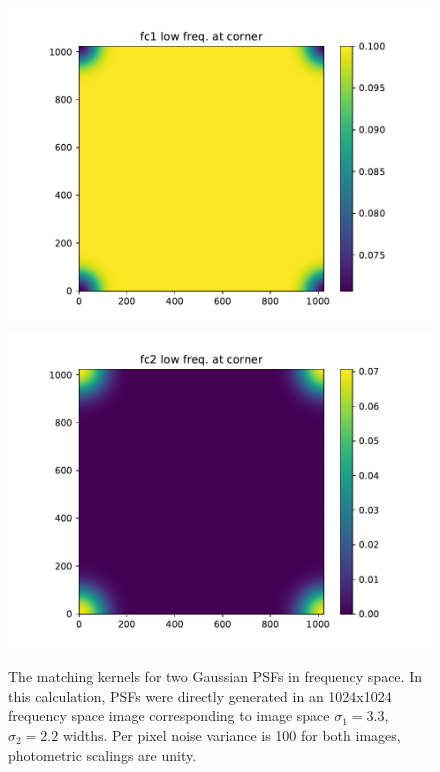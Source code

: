 \begin{figure}
\begin{center}
  \includegraphics[width=4.5in]{fig/fft_steps_direct_fc1.pdf}
  \includegraphics[width=4.5in]{fig/fft_steps_direct_fc2.pdf}
\end{center}
\caption{\label{fig:fft_steps_direct_fc1fc2}The matching kernels for two
  Gaussian PSFs in frequency space. In this calculation, PSFs were
  directly generated in an 1024x1024 frequency space image
  corresponding to image space \(\sigma_1=3.3\), \(\sigma_2=2.2\)
  widths. Per pixel noise variance is 100 for both images, photometric
  scalings are unity.}
\end{figure}
%
